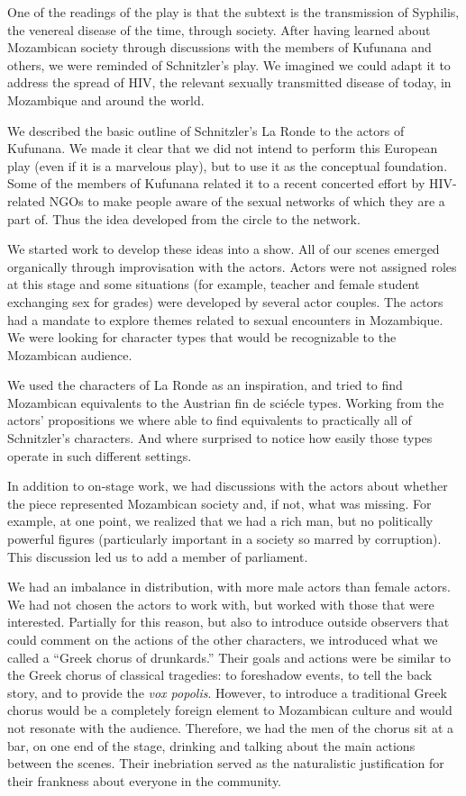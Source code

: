 \documentclass[article,twocolumn]{memoir}
\begin{document}
One of the readings of the play is that the subtext is the transmission of
Syphilis, the venereal disease of the time, through society. After having
learned about Mozambican society through discussions with the members of
Kufunana and others, we were reminded of Schnitzler's play. We imagined we
could adapt it to address the spread of HIV, the relevant sexually transmitted
disease of today, in Mozambique and around the world.

We described the basic outline of Schnitzler's La Ronde to the actors of
Kufunana. We made it clear that we did not intend to perform this European play
(even if it is a marvelous play), but to use it as the conceptual foundation.
Some of the members of Kufunana related it to a recent concerted effort by
HIV-related NGOs to make people aware of the sexual networks of which they are
a part of. Thus the idea developed from the circle to the network.

We started work to develop these ideas into a show. All of our scenes emerged
organically through improvisation with the actors. Actors were not assigned
roles at this stage and some situations (for example, teacher and female
student exchanging sex for grades) were developed by several actor couples. The
actors had a mandate to explore themes related to sexual encounters in
Mozambique. We were looking for character types that would be recognizable to
the Mozambican audience.

We used the characters of La Ronde as an inspiration, and tried to find
Mozambican equivalents to the Austrian fin de sci\'{e}cle types. Working from
the actors' propositions we where able to find equivalents to practically all
of Schnitzler's characters. And where surprised to notice how easily those
types operate in such different settings.

In addition to on-stage work, we had discussions with the actors about whether
the piece represented Mozambican society and, if not, what was missing. For
example, at one point, we realized that we had a rich man, but no politically
powerful figures (particularly important in a society so marred by corruption).
This discussion led us to add a member of parliament.

We had an imbalance in distribution, with more male actors than female actors.
We had not chosen the actors to work with, but worked with those that were
interested. Partially for this reason, but also to introduce outside observers
that could comment on the actions of the other characters, we introduced what
we called a ``Greek chorus of drunkards.'' Their goals and actions were be
similar to the Greek chorus of classical tragedies: to foreshadow events, to
tell the back story, and to provide the \textit{vox popolis}. However, to
introduce a traditional Greek chorus would be a completely foreign element to
Mozambican culture and would not resonate with the audience. Therefore, we had
the men of the chorus sit at a bar, on one end of the stage, drinking and
talking about the main actions between the scenes.  Their inebriation served as
the naturalistic justification for their frankness about everyone in the
community.
\end{document}
